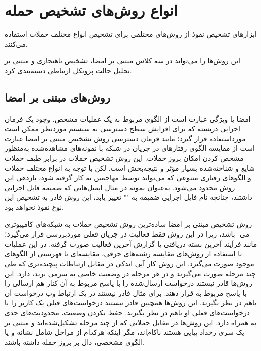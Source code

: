 \documentclass[a4paper,oneside,12pt]{report}
\begin{document}
\section{انواع روش‌های تشخیص حمله}
ابزارهای تشخیص نفوذ از روش‌های مختلفی برای تشخیص انواع مختلف حملات استفاده می‌کنند.  

این روش‌ها را می‌تواند در سه کلاس مبتنی بر امضا، تشخیص ناهنجاری و مبتنی بر تحلیل حالت پروتکل ارتباطی دسته‌بندی کرد.
\subsection{روش‌های مبتنی بر امضا}	
امضا یا ویژگی عبارت است از الگوی مربوط به یک عملیات مشخص. وجود یک فرمان اجرایی دربسته که برای افزایش سطح دسترسی به سیستم موردنظر ممکن است مورداستفاده قرار گیرد؛ مانند فرمان دسترسی 
روش تشخیص مبتنی بر امضا عبارت است از مقایسه الگوی رفتارهای در جریان در شبکه با نمونه‌های مشاهده‌شده به‌منظور مشخص کردن امکان بروز حملات. این روش تشخیص حملات در برابر طیف حملات شایع و شناخته‌شده بسیار مؤثر و نتیجه‌بخش است. لکن با توجه به انواع مختلف حملات و الگوهای رفتاری متنوعی که می‌تواند توسط مهاجمین به کار گرفته شود، بازدهی این روش محدود می‌شود. به‌عنوان نمونه در مثال ایمیل‌هایی که ضمیمه فایل اجرایی داشتند، چنانچه نام فایل اجرایی ضمیمه به 
"" 
تغییر یابد، این روش قادر به تشخیص این نوع نفوذ نخواهد بود.

 روش تشخیص مبتنی بر امضا ساده‌ترین روش تشخیص حملات به شبکه‌های کامپیوتری می- باشد، زیرا در این روش فقط فعالیت در جریان فعلی موردبررسی قرار می‌گیرد؛ مانند فرآیند آخرین بسته دریافتی یا گزارش آخرین فعالیت صورت گرفته. در این عملیات با استفاده از روش‌های مقایسه رشته‌های حرفی، مقایسه‌ای با فهرستی از الگوهای موجود صورت می‌گیرد. این روش کار آیی اندکی در مقابل ارتباطات پیچیده‌تری که طی چند مرحله صورت می‌گیرند و در هر مرحله در وضعیت خاصی به سرمی برند، دارد. این روش‌ها قادر نیستند درخواست ارسال‌شده را با پاسخ مربوط به آن کنار هم ارسالی را با پاسخ مربوط به 
 قرار دهند. برای مثال قادر نیستند در یک ارتباط وب درخواست آن باهم در نظر بگیرند. این روش‌ها همچنین قادر نیستند درخواست‌های قبلی یک کاربر را با درخواست‌های فعلی او باهم در نظر بگیرند. حفظ نکردن وضعیت، محدودیت‌های جدی به همراه دارد. این روش‌ها در مقابل حملاتی که از چند مرحله تشکیل‌شده‌اند و مبتنی بر یک سری رخداد پیاپی هستند ناکام‌اند، مگر اینکه هرکدام از مراحل شامل نشانه و یا الگوی مشخصی، دال بر بروز حمله داشته باشند.
\end{document}
